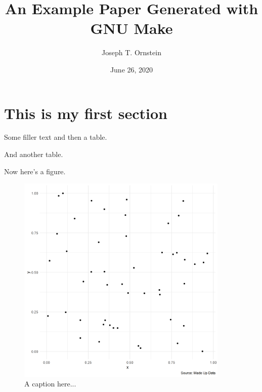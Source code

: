 \documentclass[12pt,letterpaper]{article}
\title{An Example Paper Generated with GNU Make}
\author{Joseph T. Ornstein}
\date{June 26, 2020}
\begin{document}
	
	\maketitle
	
	\section{This is my first section}
	
	
	Some filler text and then a table.
	
	
	
	And another table.
	
		
	
	Now here's a figure.
	
	\begin{figure}
		\caption{A caption here...}
		\includegraphics[width=0.9\textwidth]{figures/fig1.png}
	\end{figure}
	
	
	
\end{document}
